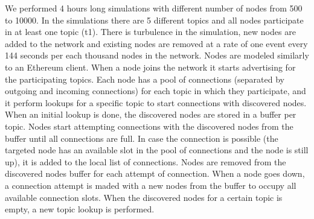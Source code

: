 We performed 4 hours long simulations with different number of nodes from 500 to 10000.
In the simulations there are 5 different topics and all nodes participate in at least one topic (t1).
There is turbulence in the simulation,  \ie new nodes are added to the network and existing nodes are removed at a rate of one event every 144 seconds per each thousand nodes in the network.
Nodes are modeled similarly to an Ethereum client. 
When a node joins the network it starts advertising for the participating topics.
Each node has a pool of connections (separated by outgoing and incoming connections) for each topic in which they participate, and it perform lookups
for a specific topic to start connections with discovered nodes.
When an initial lookup is done, the discovered nodes are stored in a buffer per topic.
Nodes start attempting connections with the discovered nodes from the buffer until all connections 
are full.
In case the connection is possible (the targeted node has an available slot in the pool of connections and the node is still up), it is added 
to the local list of connections.
Nodes are removed from the discovered nodes buffer for each attempt of connection.
When a node goes down, a connection attempt is maded with a new nodes from the buffer to occupy all available connection slots.
When the discovered nodes for a certain topic is empty, a new topic lookup is performed.




